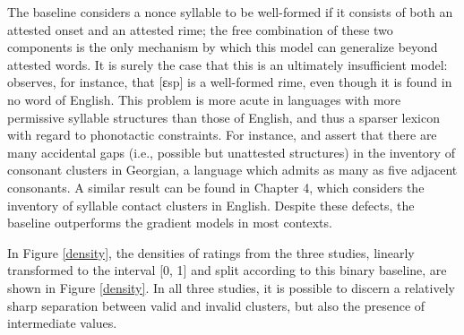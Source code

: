 The baseline considers a nonce syllable to be well-formed if it consists of both an attested onset and an attested rime; the free combination of these two components is the only mechanism by which this model can generalize beyond attested words. It is surely the case that this is an ultimately insufficient model: \citet{Albright2009a} observes, for instance, that [ɛsp] is a well-formed rime, even though it is found in no word of English. This problem is more acute in languages with more permissive syllable structures than those of English, and thus a sparser lexicon with regard to phonotactic constraints. For instance, \citet{Fischer-Jorgensen1952} and \citet{Vogt1954} assert that there are many accidental gaps (i.e., possible but unattested structures) in the inventory of consonant clusters in Georgian, a language which admits as many as five adjacent consonants. A similar result can be found in Chapter 4, which considers the inventory of syllable contact clusters in English. %
Despite these defects, the baseline outperforms the gradient models in most contexts.

In Figure \ref{density}, the densities of ratings from the three studies, linearly transformed to the interval [0, 1] and split according to this binary baseline, are shown in Figure \ref{density}. In all three studies, it is possible to discern a relatively sharp separation between valid and invalid clusters, but also the presence of intermediate values.

